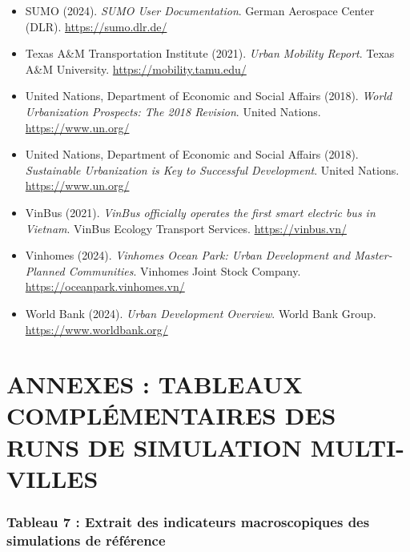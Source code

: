 \documentclass[10pt, a4paper]{article}
\begin{document}
\begin{itemize}
  \url{https://streamlit.io/}
\item
  SUMO (2024). \emph{SUMO User Documentation}. German Aerospace Center
  (DLR). \url{https://sumo.dlr.de/}
\item
  Texas A\&M Transportation Institute (2021). \emph{Urban Mobility
  Report}. Texas A\&M University. \url{https://mobility.tamu.edu/}
\item
  United Nations, Department of Economic and Social Affairs (2018).
  \emph{World Urbanization Prospects: The 2018 Revision}. United
  Nations. \url{https://www.un.org/}
\item
  United Nations, Department of Economic and Social Affairs (2018).
  \emph{Sustainable Urbanization is Key to Successful Development}.
  United Nations. \url{https://www.un.org/}
\item
  VinBus (2021). \emph{VinBus officially operates the first smart
  electric bus in Vietnam}. VinBus Ecology Transport Services.
  \url{https://vinbus.vn/}
\item
  Vinhomes (2024). \emph{Vinhomes Ocean Park: Urban Development and
  Master-Planned Communities}. Vinhomes Joint Stock Company.
  \url{https://oceanpark.vinhomes.vn/}
\item
  World Bank (2024). \emph{Urban Development Overview}. World Bank
  Group. \url{https://www.worldbank.org/}
\end{itemize}

\newpage

\section{ANNEXES : TABLEAUX COMPLÉMENTAIRES DES RUNS DE SIMULATION
MULTI-VILLES}\label{annexes-tableaux-compluxe9mentaires-des-runs-de-simulation-multi-villes}

\subsubsection{Tableau 7 : Extrait des indicateurs macroscopiques des
simulations de
référence}\label{tableau-7-extrait-des-indicateurs-macroscopiques-des-simulations-de-ruxe9fuxe9rence}
\end{document}
